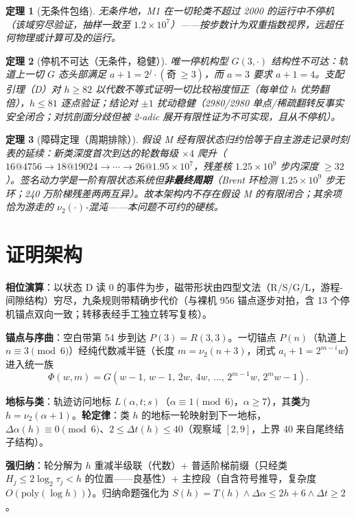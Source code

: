 \documentclass[11pt]{ctexart}
\newtheorem{theorem}{定理}[section]
\theoremstyle{definition}
\newcommand{\vtwo}[1]{\nu_2(#1)}
\begin{document}
\begin{theorem}[无条件包络]\label{thm:env}
无条件地，M1 在一切轮类不超过 2000 的运行中不停机（该域穷尽验证，抽样一致至 $1.2\times10^7$）——按步数计为双重指数视界，远超任何物理或计算可及的运行。
\end{theorem}

\begin{theorem}[停机不可达（无条件，稳健）]\label{thm:safe}
唯一停机构型 $G(3,\cdot)$ 结构性不可达：轨道上一切 $G$ 态头部满足 $a+1=2^{j}\cdot(\text{奇}\ \ge 3)$，而 $a=3$ 要求 $a+1=4$。支配引理（D）对 $h\ge 82$ 以代数不等式证明一切比较裕度恒正（每单位 $h$ 优势翻倍），$h\le 81$ 逐点验证；结论对 $\pm1$ 扰动稳健（2980/2980 单点/稀疏翻转反事实安全闭合；对抗剖面分歧但被 2-adic 展开有限性证为不可实现，且从不停机）。
\end{theorem}

\begin{theorem}[障碍定理（周期排除）]\label{thm:wall}
假设 M 经有限状态归约恰等于自主游走记录时刻表的延续：新类深度首次到达的轮数每级 $\times 4$ 爬升（$16@4756\to18@19024\to\cdots\to26@1.95\times10^7$，残差核 $1.25\times10^9$ 步内深度 $\ge 32$）。签名动力学是一阶有限状态系统但\textbf{非最终周期}（Brent 环检测 $1.25\times10^9$ 步无环；240 万阶梯残差两两互异）。故本架构内不存在假设 M 的有限闭合；其余项恰为游走的 $\vtwo{\cdot}$-混沌——本问题不可约的硬核。
\end{theorem}

\section{证明架构}

\textbf{相位演算}：以状态 D 读 0 的事件为步，磁带形状由四型文法（R/S/G/L，游程-间隙结构）穷尽，九条规则带精确步代价（与裸机 956 锚点逐步对拍，含 13 个停机锚点双向一致；转移表经手工独立转写复核）。

\textbf{锚点与序曲}：空白带第 54 步到达 $P(3)=R(3,3)$。一切锚点 $P(n)$（轨道上 $n\equiv 3\pmod 6$）经纯代数减半链（长度 $m=\vtwo{n+3}$，闭式 $a_i+1=2^{m-i}w$）进入统一族
\[
\Phi(w,m)=G(w-1,\,w-1,\,2w,\,4w,\,\dots,\,2^{m-1}w,\,2^{m}w-1).
\]

\textbf{地标与类}：轨迹访问地标 $L(\alpha,t;s)$（$\alpha\equiv 1\pmod 6$，$\alpha\ge 7$），其\textbf{类}为 $h=\vtwo{\alpha+1}$。\textbf{轮定律}：类 $h$ 的地标一轮映射到下一地标，$\Delta\alpha(h)\equiv 0\pmod 6$、$2\le\Delta t(h)\le 40$（观察域 $[2,9]$，上界 40 来自尾终结子结构）。

\textbf{强归纳}：轮分解为 $h$ 重减半级联（代数）+ 普适阶梯前缀（只经类 $H_j\le 2\log_2\tau_j<h$ 的位置——良基性）+ 主控段（自含符号推导，复杂度 $O(\mathrm{poly}(\log h))$）。归纳命题强化为 $S(h)=T(h)\wedge\Delta\alpha\le 2h+6\wedge\Delta t\ge 2$。
\end{document}
